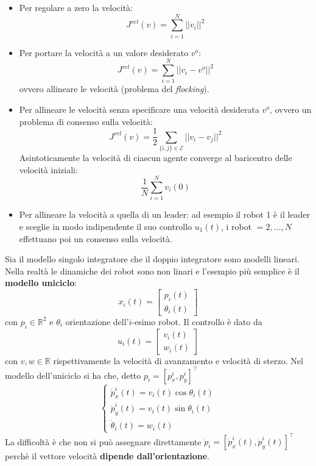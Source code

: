 \begin{itemize}
\item Per regolare a zero la velocit\`a:
  \begin{equation}
  J^{vel}(v) = \sum_{i=1}^N ||v_i||^2
  \end{equation}
\item Per portare la velocit\`a a un valore desiderato $v^o$:
  \begin{equation}
  J^{vel}(v) = \sum_{i=1}^N ||v_i - v^o||^2
  \end{equation} ovvero allineare le velocit\`a (problema del \textit{flocking}).
\item Per allineare le velocit\`a senza specificare una velocit\`a desiderata $v^o$, ovvero un problema di consenso sulla velocit\`a:
  \begin{equation}
  J^{vel}(v) = \frac{1}{2} \sum_{\{i,j\} \in \mathcal{E}} ||v_i - v_j||^2
  \end{equation} Asintoticamente la velocit\`a di ciascun agente converge al baricentro delle velocit\`a iniziali:
  \begin{equation}
  \frac{1}{N} \sum_{i=1}^N v_i(0)
  \end{equation}
\item Per allineare la velocit\`a a quella di un leader: ad esempio il robot 1 \`e il leader e sceglie in modo indipendente il suo controllo $u_1(t)$, i robot $=2,\dots,N$ effettuano poi un consenso sulla velocit\`a.
\end{itemize}
Sia il modello singolo integratore che il doppio integratore sono modelli lineari. Nella realt\`a le dinamiche dei robot sono non linari e l'esempio pi\`u semplice \`e il \textbf{modello uniciclo}:
\begin{equation}
x_i(t) = \begin{bmatrix}
p_i(t) \\
\theta_i(t)
\end{bmatrix}
\end{equation} con $p_i \in \mathbb{R}^2$ e $\theta_i$ orientazione dell'$i$-esimo robot. Il controllo \`e dato da
\begin{equation}
u_i(t) = \begin{bmatrix}
v_i(t) \\
w_i(t)
\end{bmatrix}
\end{equation} con $v, w \in \mathbb{R}$ rispettivamente la velocit\`a di avanzamento e velocit\`a di sterzo. Nel modello dell'uniciclo si ha che, detto $p_i = [p_x^i, p_y^i]^\intercal $
\begin{equation}
\begin{cases}
\dot{p}_x^i(t) = v_i(t) \cos \theta_i(t) \\
\dot{p}_y^i(t) = v_i(t) \sin \theta_i(t) \\
\dot{\theta}_i(t) = w_i(t)
\end{cases}
\end{equation} La difficolt\`a \`e che non si pu\`o assegnare direttamente $\dot{p}_i = [\dot{p}_x^i(t), \dot{p}_y^i(t)]^\intercal $ perch\`e il vettore velocit\`a \textbf{dipende dall'orientazione}.
